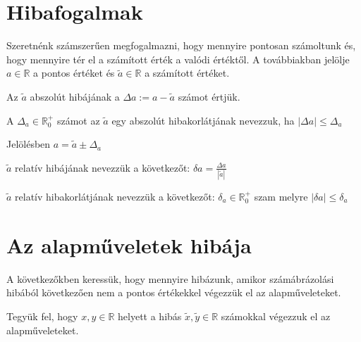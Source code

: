 \section{Hibafogalmak}
Szeretnénk számszerűen megfogalmazni, hogy mennyire pontosan számoltunk és, hogy mennyire tér el a számított érték a valódi értéktől. A továbbiakban jelölje $a \in \mathbb{R}$ a pontos értéket és $\tilde{a} \in \mathbb{R}$ a számított értéket.
\begin{definition}
    Az $\tilde{a}$ abszolút hibájának a $\Delta a := a - \tilde{a}$ számot értjük.
\end{definition}
\begin{definition}
    A $\Delta_{a} \in \mathbb{R}_{0}^{+}$ számot az $\tilde{a}$ egy abszolút hibakorlátjának nevezzuk, ha $|\Delta a| \leq \Delta_{a}$
\end{definition}
Jelölésben $a = \tilde{a} \pm \Delta_a$
\begin{definition}
    $\tilde{a}$ relatív hibájának nevezzük a következőt: $\delta a = \frac{\Delta a}{|\tilde{a}|}$
\end{definition}
\begin{definition}
    $\tilde{a}$ relatív hibakorlátjának nevezzük a következőt: $\delta_{a} \in \mathbb{R}_{0}^{+}$ szam melyre $|\delta a| \leq \delta_{a}$
\end{definition}

\section{Az alapműveletek hibája}
A következőkben keressük, hogy mennyire hibázunk, amikor számábrázolási hibából következően nem a pontos értékekkel végezzük el az alapműveleteket.

Tegyük fel, hogy $x, y \in \mathbb{R}$ helyett a hibás $\tilde{x},\tilde{y} \in \mathbb{R}$ számokkal végezzuk el az alapműveleteket.

